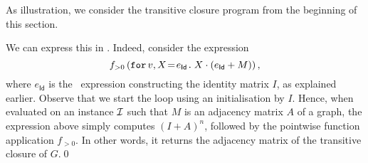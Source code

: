 As illustration, we consider the transitive closure program from the beginning of this section.
\begin{example}
 We can
express this in \langfor. Indeed, consider the expression 
$$
f_{>0}\left(\initf{e_{\mathsf{Id}}}{v}{X}{X\cdot (e_{\mathsf{Id}}+M)}\right),
$$
where $e_{\mathsf{Id}}$ is the \langfor\ expression constructing the identity matrix $I$, as explained earlier.
Observe that we start the loop using an initialisation by $I$. Hence, when evaluated on an instance $\I$ such that $M$ is an adjacency matrix $A$ of a graph, the expression above simply computes $(I+A)^n$, followed by the pointwise function application $f_{>0}$. In other words, it returns the adjacency matrix of the transitive closure of $G$.\qed
\end{example}
%




